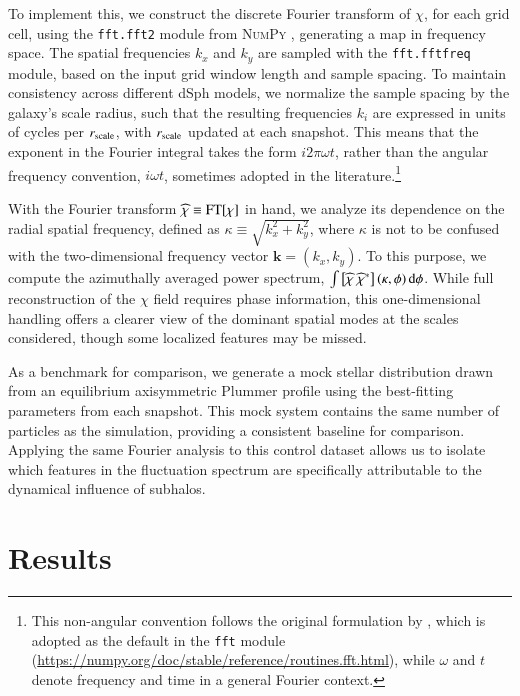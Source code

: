 \documentclass[fleqn,usenatbib]{mnras}
\newcommand{\diff}{{\rm d}}
\begin{document}
To implement this, we construct the discrete Fourier transform of $\chi$, for each grid cell, using the \texttt{fft.fft2} module from \textsc{NumPy} \citep{vanderWalt11}, generating a map in frequency space. The spatial frequencies $k_x$ and $k_y$ are sampled with the \texttt{fft.fftfreq} module, based on the input grid window length and sample spacing. To maintain consistency across different dSph models, we normalize the sample spacing by the galaxy’s scale radius, such that the resulting frequencies $k_{i}$ are expressed in units of cycles per $r_{\rm scale}$, with $r_{\rm scale}$ updated at each snapshot. This means that the exponent in the Fourier integral takes the form $i 2\pi \omega t$, rather than the angular frequency convention, $i \omega t$, sometimes adopted in the literature.\footnote{This non-angular convention follows the original formulation by \cite{Cooley&Tukey65}, which is adopted as the default in the \texttt{fft} module \\(\url{https://numpy.org/doc/stable/reference/routines.fft.html}), while $\omega$ and $t$ denote frequency and time in a general Fourier context.}

With the Fourier transform $\widehat{\chi}\equiv {\rm FT}[\chi]$ in hand, we analyze its dependence on the radial spatial frequency, defined as $\kappa \equiv \sqrt{k_{x}^{2} + k_{y}^{2}}$, where $\kappa$ is not to be confused with the two-dimensional frequency vector $\textbf{k} = (k_{x}, k_{y})$. 
To this purpose, we compute the azimuthally averaged power spectrum, $\int \left[ \widehat{\chi} \ \widehat{\chi}^{*} \right](\kappa, \phi) \, \diff \phi$. While full reconstruction of the $\chi$ field requires phase information, this one-dimensional handling offers a clearer view of the dominant spatial modes at the scales considered, though some localized features may be missed.

As a benchmark for comparison, we generate a mock stellar distribution drawn from an equilibrium axisymmetric Plummer profile using the best-fitting parameters from each snapshot. This mock system contains the same number of particles as the simulation, providing a consistent baseline for comparison. Applying the same Fourier analysis to this control dataset allows us to isolate which features in the fluctuation spectrum are specifically attributable to the dynamical influence of subhalos.

\section{Results} \label{sec: results}
\end{document}
